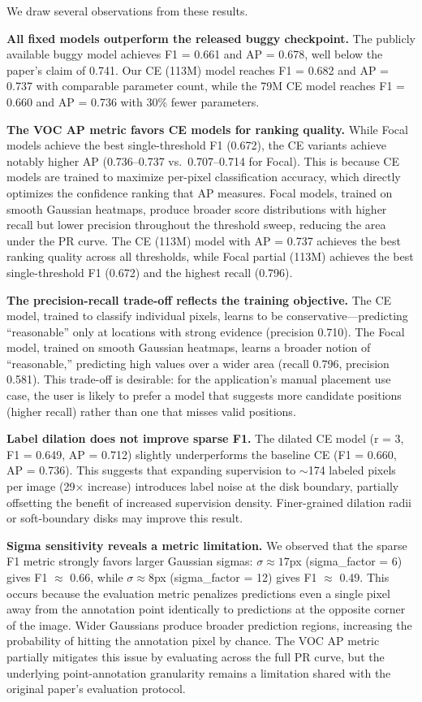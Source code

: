 \documentclass[10pt,twocolumn]{article}
\begin{document}
We draw several observations from these results.

\textbf{All fixed models outperform the released buggy checkpoint.} The publicly available buggy model achieves F1 = 0.661 and AP = 0.678, well below the paper's claim of 0.741. Our CE (113M) model reaches F1 = 0.682 and AP = 0.737 with comparable parameter count, while the 79M CE model reaches F1 = 0.660 and AP = 0.736 with 30\% fewer parameters.

\textbf{The VOC AP metric favors CE models for ranking quality.} While Focal models achieve the best single-threshold F1 (0.672), the CE variants achieve notably higher AP (0.736--0.737 vs.\ 0.707--0.714 for Focal). This is because CE models are trained to maximize per-pixel classification accuracy, which directly optimizes the confidence ranking that AP measures. Focal models, trained on smooth Gaussian heatmaps, produce broader score distributions with higher recall but lower precision throughout the threshold sweep, reducing the area under the PR curve. The CE (113M) model with AP = 0.737 achieves the best ranking quality across all thresholds, while Focal partial (113M) achieves the best single-threshold F1 (0.672) and the highest recall (0.796).

\textbf{The precision-recall trade-off reflects the training objective.} The CE model, trained to classify individual pixels, learns to be conservative---predicting ``reasonable'' only at locations with strong evidence (precision 0.710). The Focal model, trained on smooth Gaussian heatmaps, learns a broader notion of ``reasonable,'' predicting high values over a wider area (recall 0.796, precision 0.581). This trade-off is desirable: for the application's manual placement use case, the user is likely to prefer a model that suggests more candidate positions (higher recall) rather than one that misses valid positions.

\textbf{Label dilation does not improve sparse F1.} The dilated CE model (r = 3, F1 = 0.649, AP = 0.712) slightly underperforms the baseline CE (F1 = 0.660, AP = 0.736). This suggests that expanding supervision to $\sim$174 labeled pixels per image (29$\times$ increase) introduces label noise at the disk boundary, partially offsetting the benefit of increased supervision density. Finer-grained dilation radii or soft-boundary disks may improve this result.

\textbf{Sigma sensitivity reveals a metric limitation.} We observed that the sparse F1 metric strongly favors larger Gaussian sigmas: $\sigma \approx 17$px (sigma\_factor = 6) gives F1 $\approx$ 0.66, while $\sigma \approx 8$px (sigma\_factor = 12) gives F1 $\approx$ 0.49. This occurs because the evaluation metric penalizes predictions even a single pixel away from the annotation point identically to predictions at the opposite corner of the image. Wider Gaussians produce broader prediction regions, increasing the probability of hitting the annotation pixel by chance. The VOC AP metric partially mitigates this issue by evaluating across the full PR curve, but the underlying point-annotation granularity remains a limitation shared with the original paper's evaluation protocol.
\end{document}
